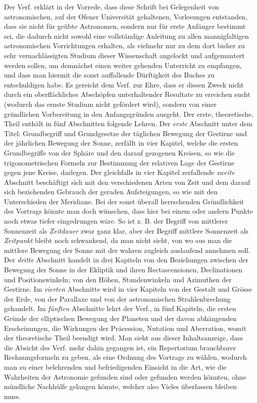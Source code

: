 Der Verf. erklärt in der Vorrede, dass diese Schrift bei Gelegenheit von astronomischen, auf der Ofener Universität gehaltenen, Vorlesungen entstanden, dass sie nicht für geübte Astronomen, sondern nur für erste Anfänger bestimmt sei, die dadurch nicht sowohl eine vollständige Anleitung zu allen mannigfaltigen astronomischen Vorrichtungen erhalten, als vielmehr nur zu dem dort bisher zu sehr vernachlässigten Studium dieser Wissenschaft angelockt und aufgemuntert werden sollen, um demnächst einen weiter gehenden Unterricht zu empfangen, und dass man hiermit die sonst auffallende Dürftigkeit des Buches zu entschuldigen habe. Es gereicht dem Verf. zur Ehre, dass er diesen Zweck nicht durch ein oberflächliches Abschöpfen unterhaltender Resultate zu erreichen sucht (wodurch das ernste Studium nicht gefördert wird), sondern von einer gründlichen Vorbereitung in den Anfangsgründen ausgeht. Der erste, theoretische, Theil enthält in fünf Abschnitten folgende Lehren. Der \emph{erste} Abschnitt unter dem Titel: Grundbegriff und Grundgesetze der täglichen Bewegung der Gestirne und der jährlichen Bewegung der Sonne, zerfällt in vier Kapitel, welche die ersten Grundbegriffe von der Sphäre und den darauf gezogenen Kreisen, so wie die trigonometrischen Formeln zur Bestimmung der relativen Lage der Gestirne gegen jene Kreise, darlegen. Der gleichfalls in vier Kapitel zerfallende \emph{zweite} Abschnitt beschäftigt sich mit den verschiedenen Arten von Zeit und dem darauf sich beziehenden Gebrauch der geraden Aufsteigungen, so wie mit den Unterschieden der Meridiane. Bei der sonst überall herrschenden Gründlichkeit des Vortrags könnte man doch wünschen, dass hier bei einem oder andern Punkte noch etwas tiefer eingedrungen wäre. So ist z. B. der Begriff von mittlerer Sonnenzeit als \emph{Zeitdauer} zwar ganz klar, aber der Begriff mittlere Sonnenzeit als \emph{Zeitpunkt} bleibt noch schwankend, da man nicht sieht, von wo aus man die mittlere Bewegung der Sonne mit der wahren zugleich auslaufend annehmen soll. Der \emph{dritte} Abschnitt handelt in drei Kapiteln von den Beziehungen zwischen der Bewegung der Sonne in der Ekliptik und ihren Rectascensionen, Declinationen und Positionswinkeln; von den Höhen, Stundenwinkeln und Azimuthen der Gestirne. Im \emph{vierten} Abschnitte wird in vier Kapiteln von der Gestalt und Grösse der Erde, von der Parallaxe und von der astronomischen Strahlenbrechung gehandelt. Im \emph{fünften} Abschnitte lehrt der Verf., in fünf Kapiteln, die ersten Gründe der elliptischen Bewegung der Planeten und der davon abhängenden Erscheinungen, die Wirkungen der Präcession, Nutation und Aberration, womit der theoretische Theil beendigt wird. Man sieht aus dieser Inhaltsanzeige, dass die Absicht des Verf. mehr dahin gegangen ist, ein Repertorium brauchbarer Rechnungsformeln zu geben, als eine Ordnung des Vortrags zu wählen, wodurch man zu einer belehrenden und befriedigenden Einsicht in die Art, wie die Wahrheiten der Astronomie gefunden sind oder gefunden werden könnten, ohne mündliche Nachhülfe gelangen könnte, welcher also Vieles überlassen bleiben muss.


